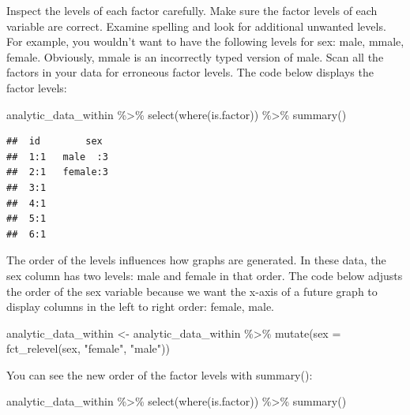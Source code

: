 \documentclass[
]{krantz}
\makeatletter
\newenvironment{Shaded}{\begin{snugshade}}{\end{snugshade}}
\newcommand{\AttributeTok}[1]{\textcolor[rgb]{0.61,0.61,0.61}{#1}}
\newcommand{\FunctionTok}[1]{\textcolor[rgb]{0,0,0}{#1}}
\newcommand{\NormalTok}[1]{#1}
\newcommand{\OtherTok}[1]{\textcolor[rgb]{0.37,0.37,0.37}{#1}}
\newcommand{\SpecialCharTok}[1]{\textcolor[rgb]{0,0,0}{#1}}
\newcommand{\StringTok}[1]{\textcolor[rgb]{0.5,0.5,0.5}{#1}}
\newenvironment{kframe}{%
\medskip{}
\setlength{\fboxsep}{.8em}
 \def\at@end@of@kframe{}%
 \ifinner\ifhmode%
  \def\at@end@of@kframe{\end{minipage}}%
  \begin{minipage}{\columnwidth}%
 \fi\fi%
 \def\FrameCommand##1{\hskip\@totalleftmargin \hskip-\fboxsep
 \colorbox{shadecolor}{##1}\hskip-\fboxsep
     \hskip-\linewidth \hskip-\@totalleftmargin \hskip\columnwidth}%
 \MakeFramed {\advance\hsize-\width
   \@totalleftmargin\z@ \linewidth\hsize
   \@setminipage}}%
 {\par\unskip\endMakeFramed%
 \at@end@of@kframe}
\renewenvironment{Shaded}{\begin{kframe}}{\end{kframe}}
\makeatother
\begin{document}
Inspect the levels of each factor carefully. Make sure the factor levels of each variable are correct. Examine spelling and look for additional unwanted levels. For example, you wouldn't want to have the following levels for sex: male, mmale, female. Obviously, mmale is an incorrectly typed version of male. Scan all the factors in your data for erroneous factor levels. The code below displays the factor levels:

\begin{Shaded}
\begin{Highlighting}[]
\NormalTok{analytic\_data\_within }\SpecialCharTok{\%\textgreater{}\%}
  \FunctionTok{select}\NormalTok{(}\FunctionTok{where}\NormalTok{(is.factor)) }\SpecialCharTok{\%\textgreater{}\%}
  \FunctionTok{summary}\NormalTok{()}
\end{Highlighting}
\end{Shaded}

\begin{verbatim}
##  id        sex   
##  1:1   male  :3  
##  2:1   female:3  
##  3:1             
##  4:1             
##  5:1             
##  6:1
\end{verbatim}

The order of the levels influences how graphs are generated. In these data, the sex column has two levels: male and female in that order. The code below adjusts the order of the sex variable because we want the x-axis of a future graph to display columns in the left to right order: female, male.

\begin{Shaded}
\begin{Highlighting}[]
\NormalTok{analytic\_data\_within }\OtherTok{\textless{}{-}}\NormalTok{ analytic\_data\_within }\SpecialCharTok{\%\textgreater{}\%}
  \FunctionTok{mutate}\NormalTok{(}\AttributeTok{sex =} \FunctionTok{fct\_relevel}\NormalTok{(sex,}
                           \StringTok{"female"}\NormalTok{,}
                           \StringTok{"male"}\NormalTok{))}
\end{Highlighting}
\end{Shaded}

You can see the new order of the factor levels with summary():

\begin{Shaded}
\begin{Highlighting}[]
\NormalTok{analytic\_data\_within }\SpecialCharTok{\%\textgreater{}\%}
  \FunctionTok{select}\NormalTok{(}\FunctionTok{where}\NormalTok{(is.factor)) }\SpecialCharTok{\%\textgreater{}\%}
  \FunctionTok{summary}\NormalTok{()}
\end{Highlighting}
\end{Shaded}
\end{document}
